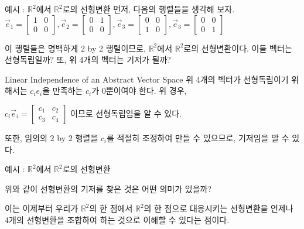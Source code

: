 \documentclass{beamer}
\begin{document}
\begin{frame}{예시 : $\mathds{R}^2$에서 $\mathds{R}^2$로의 선형변환} 
먼저, 다음의 행렬들을 생각해 보자. 
$ \vec{e}_1 =  
\left[ \begin{matrix}
1 & 0  \\
0 & 0 
\end{matrix} \right],
\vec{e}_2 = 
\left[ \begin{matrix}
0 & 1  \\
0 & 0 
\end{matrix} \right],
\vec{e}_3 = 
\left[ \begin{matrix}
0 & 0  \\
1 & 0 
\end{matrix} \right],
\vec{e}_3 = 
\left[ \begin{matrix}
0 & 0  \\
0 & 1 
\end{matrix} \right]
$

이 행렬들은 명백하게 2 by 2 행렬이므로, $\mathds{R}^2$에서 $\mathds{R}^2$로의 선형변환이다. 이들 벡터는 선형독립일까? 또, 위 4개의 벡터는 기저가 될까? 
\end{frame}

\begin{frame}{Linear Independence of an Abstract Vector Space}
위 4개의 벡터가 선형독립이기 위해서는 $c_ie_i$을 만족하는 $c_i$가 0뿐이여야 한다. 위 경우, 

$c_i\vec{e}_i = \left[ \begin{matrix}
c_1 & c_2  \\
c_3 & c_4 
\end{matrix} \right]$ 이므로 선형독립임을 알 수 있다. 

또한, 임의의 2 by 2 행렬을 $c_i$를 적절히 조정하여 만들 수 있으므로, 기저임을 알 수 있다. 
\end{frame}



\begin{frame}{예시 : $\mathds{R}^2$에서 $\mathds{R}^2$로의 선형변환} 

위와 같이 선형변환의 기저를 찾은 것은 어떤 의미가 있을까? 

이는 이제부터 우리가 $\mathds{R}^2$의 한 점에서 $\mathds{R}^2$의 한 점으로 대응시키는 선형변환을 언제나 4개의 선형변환을 조합하여 하는 것으로 이해할 수 있다는 점이다. 
\end{frame}


\end{document}
